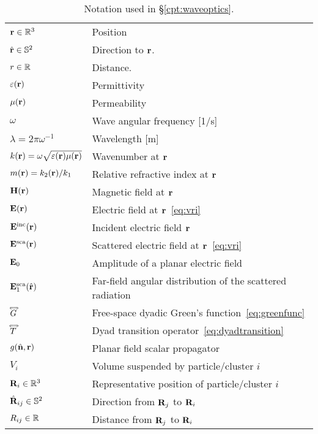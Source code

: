 \begin{table}[h!]
	\centering
    \caption[Notation used in \S\ref{cpt:waveoptics}]{\label{tab:waveoptics:notation}
    	Notation used in \S\ref{cpt:waveoptics}.
    }
	\renewcommand{\arraystretch}{1.2}
    \begin{tabular}{ll}
        $\mathbf{r}\in\mathbb{R}^3$ & Position \\
        $\hat{\mathbf{r}}\in\mathbb{S}^2$ & Direction to $\mathbf{r}$. \\
        $r\in\mathbb{R}$ & Distance. \\
        \hline
        $\varepsilon(\mathbf{r})$ & Permittivity \\
        $\mu(\mathbf{r})$ & Permeability \\
        $\omega$ & Wave angular frequency [1/s] \\
        $\lambda=2\pi\omega^{-1}$ & Wavelength [m] \\
        $k(\mathbf{r})=\omega\sqrt{\varepsilon(\mathbf{r})\mu(\mathbf{r})}$ & Wavenumber at $\mathbf{r}$\\
        $m(\mathbf{r})=k_2(\mathbf{r})/k_1$ & Relative refractive index at $\mathbf{r}$ \\
        \hline
        $\mathbf{H}(\mathbf{r})$ & Magnetic field at $\mathbf{r}$ \\
        $\mathbf{E}(\mathbf{r})$   & Electric field at $\mathbf{r}$~\eqref{eq:vri}  \\
        $\mathbf{E}^\mathrm{inc}(\mathbf{r})$ & Incident electric field $\mathbf{r}$\\
        $\mathbf{E}^\mathrm{sca}(\mathbf{r})$ & Scattered electric field at $\mathbf{r}$~\eqref{eq:vri}\\ 
        $\mathbf{E}_0$ & Amplitude of a planar electric field \\
        $\mathbf{E}^\mathrm{sca}_1(\hat{\mathbf{r}})$ & Far-field angular distribution of the scattered radiation  \\
        \hline
        ${\accentset{\Longleftrightarrow}{G}}$ & Free-space dyadic Green's function~\eqref{eq:greenfunc} \\
        ${\accentset{\Longleftrightarrow}{T}}$ & Dyad transition operator~\eqref{eq:dyadtransition}\\
        $g(\hat{\mathbf{n}},\mathbf{r})$ & Planar field scalar propagator \\
        \hline
        \hline
        $V_i$ & Volume suspended by particle/cluster $i$ \\
        $\mathbf{R}_i\in\mathbb{R}^3$ & Representative position of particle/cluster $i$ \\
        $\hat{\mathbf{R}}_{ij}\in\mathbb{S}^2$ & Direction from $\mathbf{R}_j$ to $\mathbf{R}_i$\\
        $R_{ij}\in\mathbb{R}$ & Distance from $\mathbf{R}_j$ to $\mathbf{R}_i$\\

\end{tabular}
\end{table}
